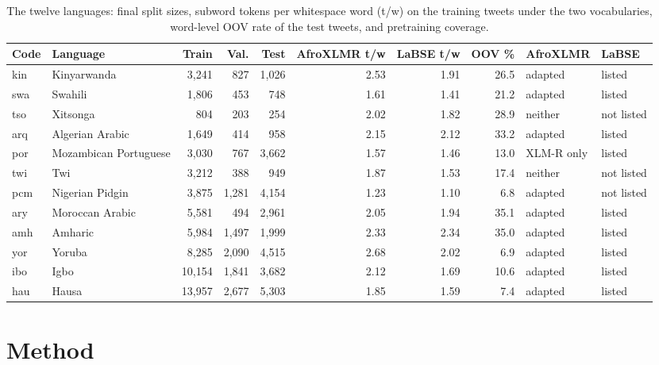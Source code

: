 \documentclass[11pt]{article}
\begin{document}
\begin{table}[t]
\centering
\footnotesize
\setlength{\tabcolsep}{3.5pt}
\begin{tabular}{llrrrrrrll}
\toprule
Code & Language & Train & Val. & Test & AfroXLMR t/w & LaBSE t/w & OOV \% & AfroXLMR & LaBSE \\
\midrule
kin & Kinyarwanda & 3,241 & 827 & 1,026 & 2.53 & 1.91 & 26.5 & adapted & listed \\
swa & Swahili & 1,806 & 453 & 748 & 1.61 & 1.41 & 21.2 & adapted & listed \\
tso & Xitsonga & 804 & 203 & 254 & 2.02 & 1.82 & 28.9 & neither & not listed \\
arq & Algerian Arabic & 1,649 & 414 & 958 & 2.15 & 2.12 & 33.2 & adapted & listed \\
por & Mozambican Portuguese & 3,030 & 767 & 3,662 & 1.57 & 1.46 & 13.0 & XLM-R only & listed \\
twi & Twi & 3,212 & 388 & 949 & 1.87 & 1.53 & 17.4 & neither & not listed \\
pcm & Nigerian Pidgin & 3,875 & 1,281 & 4,154 & 1.23 & 1.10 & 6.8 & adapted & not listed \\
ary & Moroccan Arabic & 5,581 & 494 & 2,961 & 2.05 & 1.94 & 35.1 & adapted & listed \\
amh & Amharic & 5,984 & 1,497 & 1,999 & 2.33 & 2.34 & 35.0 & adapted & listed \\
yor & Yoruba & 8,285 & 2,090 & 4,515 & 2.68 & 2.02 & 6.9 & adapted & listed \\
ibo & Igbo & 10,154 & 1,841 & 3,682 & 2.12 & 1.69 & 10.6 & adapted & listed \\
hau & Hausa & 13,957 & 2,677 & 5,303 & 1.85 & 1.59 & 7.4 & adapted & listed \\
\bottomrule
\end{tabular}
\caption{The twelve languages: final split sizes, subword tokens per whitespace word (t/w) on the training tweets under the two vocabularies, word-level OOV rate of the test tweets, and pretraining coverage.}
\label{tab:data}
\end{table}

\section{Method}
\end{document}
